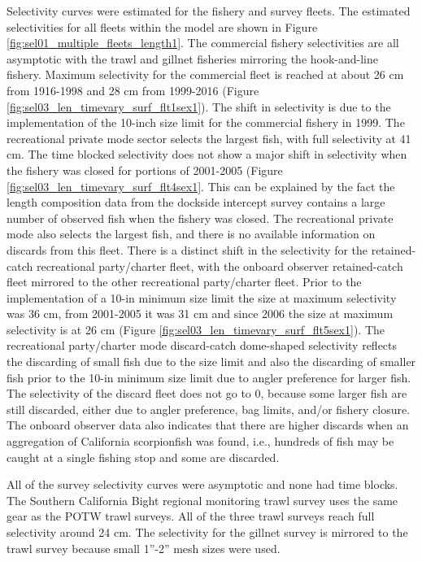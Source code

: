 \documentclass[12pt,]{article}
\begin{document}
Selectivity curves were estimated for the fishery and survey fleets. The
estimated selectivities for all fleets within the model are shown in
Figure \ref{fig:sel01_multiple_fleets_length1}. The commercial fishery
selectivities are all asymptotic with the trawl and gillnet fisheries
mirroring the hook-and-line fishery. Maximum selectivity for the
commercial fleet is reached at about 26 cm from 1916-1998 and 28 cm from
1999-2016 (Figure \ref{fig:sel03_len_timevary_surf_flt1sex1}). The shift
in selectivity is due to the implementation of the 10-inch size limit
for the commercial fishery in 1999. The recreational private mode sector
selects the largest fish, with full selectivity at 41 cm. The time
blocked selectivity does not show a major shift in selectivity when the
fishery was closed for portions of 2001-2005 (Figure
\ref{fig:sel03_len_timevary_surf_flt4sex1}. This can be explained by the
fact the length composition data from the dockside intercept survey
contains a large number of observed fish when the fishery was closed.
The recreational private mode also selects the largest fish, and there
is no available information on discards from this fleet. There is a
distinct shift in the selectivity for the retained-catch recreational
party/charter fleet, with the onboard observer retained-catch fleet
mirrored to the other recreational party/charter fleet. Prior to the
implementation of a 10-in minimum size limit the size at maximum
selectivity was 36 cm, from 2001-2005 it was 31 cm and since 2006 the
size at maximum selectivity is at 26 cm (Figure
\ref{fig:sel03_len_timevary_surf_flt5sex1}). The recreational
party/charter mode discard-catch dome-shaped selectivity reflects the
discarding of small fish due to the size limit and also the discarding
of smaller fish prior to the 10-in minimum size limit due to angler
preference for larger fish. The selectivity of the discard fleet does
not go to 0, because some larger fish are still discarded, either due to
angler preference, bag limits, and/or fishery closure. The onboard
observer data also indicates that there are higher discards when an
aggregation of California scorpionfish was found, i.e., hundreds of fish
may be caught at a single fishing stop and some are discarded.

All of the survey selectivity curves were asymptotic and none had time
blocks. The Southern California Bight regional monitoring trawl survey
uses the same gear as the POTW trawl surveys. All of the three trawl
surveys reach full selectivity around 24 cm. The selectivity for the
gillnet survey is mirrored to the trawl survey because small 1''-2''
mesh sizes were used.
\end{document}
